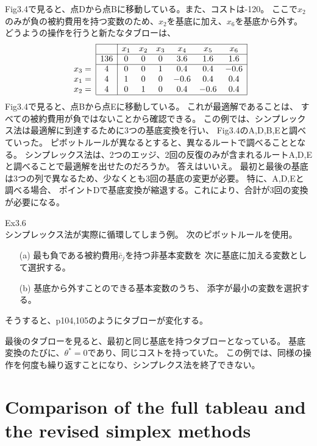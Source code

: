 \documentclass{jsarticle}
\begin{document}
Fig3.4で見ると、点Dから点Bに移動している。また、コストは-120。
ここで$x_2$のみが負の被約費用を持つ変数のため、$x_2$を基底に加え、$x_6$を基底から外す。
どうようの操作を行うと新たなタブローは、
\begin{equation}
  \begin{array}{c|c|cccccc|}
    \cline{2-8} 
    && x_{1} & x_{2} & x_{3} & x_{4} & x_{5} & x_{6} \\
    \cline{2-8}   
    &136 & 0 & 0 & 0 & 3.6 & 1.6 & 1.6 \\
    \cline{2-8} 
    x_3=&4&0 & 0 & 1 & 0.4 & 0.4 & -0.6 \\
    x_1=&4&1 & 0 & 0 &-0.6 & 0.4 & 0.4 \\
    x_2=&4&0 & 1 & 0 & 0.4 &-0.6 & 0.4 \\
    \cline{2-8} 
  \end{array}
\end{equation}
Fig3.4で見ると、点Bから点Eに移動している。
これが最適解であることは、
すべての被約費用が負ではないことから確認できる。
この例では、シンプレックス法は最適解に到達するために3つの基底変換を行い、
Fig3.4のA,D,B,Eと調べていった。
ピボットルールが異なるとすると、異なるルートで調べることとなる。
シンプレックス法は、2つのエッジ、2回の反復のみが含まれるルートA,D,Eと調べることで最適解を出せたのだろうか。
答えはいいえ。
最初と最後の基底は3つの列で異なるため、少なくとも3回の基底の変更が必要。
特に、A,D,Eと調べる場合、
ポイントDで基底変換が縮退する。これにより、合計が3回の変換が必要になる。

Ex3.6\\
シンプレックス法が実際に循環してしまう例。
次のピボットルールを使用。
\begin{itemize}
  \item[(a)] 最も負である被約費用$\bar{c}_j$を持つ非基本変数を
  次に基底に加える変数として選択する。
  \item[(b)] 基底から外すことのできる基本変数のうち、
  添字が最小の変数を選択する。 
\end{itemize}
そうすると、p104,105のようにタブローが変化する。

最後のタブローを見ると、最初と同じ基底を持つタブローとなっている。
基底変換のたびに、$\theta^* = 0$であり、同じコストを持っていた。
この例では、同様の操作を何度も繰り返すことになり、シンプレクス法を終了できない。




\section*{Comparison of the full tableau and the revised simplex methods}
\end{document}
